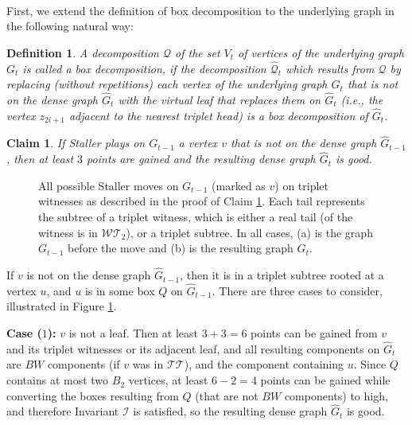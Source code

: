 \documentclass[11pt]{article}
\def\Proof{\par\noindent{\bf Proof:~}}
\newtheorem{definition}[theorem]{Definition}
\newtheorem{claim}[theorem]{Claim}
\theoremstyle{definition}
\def\invboxes{\mathcal{I}}
\begin{document}
\paragraph{}

First, we extend the definition of box decomposition to the underlying graph in the following natural way:
\begin{definition}
A decomposition $\mathcal{Q}$ of the set $V_t$ of vertices of the underlying graph $G_t$ is called a \emph{box decomposition}, if the decomposition $\hat{\mathcal{Q}}_t$ which results from $\mathcal{Q}$ by replacing (without repetitions) each vertex of the underlying graph $G_t$ that is not on the dense graph $\hat{G}_t$ with the virtual leaf that replaces them on $\hat{G}_t$ (i.e., the vertex $z_{2i+1}$ adjacent to the nearest triplet head) is a box decomposition of $\hat{G}_t$.
\end{definition}


\begin{claim}
\label{claim:staller_triplet}
If Staller plays on $G_{t-1}$ a vertex $v$ that is not on the dense graph $\hat{G}_{t-1}$, then at least $3$ points are gained and the resulting dense graph $\hat{G}_t$ is good.
\end{claim}
\begin{figure}[thbp] 
  \caption{\sf All possible Staller moves on $G_{t-1}$ (marked as $v$) on triplet witnesses as described in the proof of Claim \ref{claim:staller_triplet}.
	Each tail represents the subtree of a triplet witness, which is either a real tail (of the witness is in $\mathcal{WT}_2$), or a triplet subtree. 
	In all cases, (a) is the graph $G_{t-1}$ before the move and (b) is the resulting graph $G_t$.}
  \medskip
  \centering
  \label{fig:triplet_staller}
\end{figure}
\Proof
If $v$ is not on the dense graph $\hat{G}_{t-1}$, then it is in a triplet subtree rooted at a vertex $u$, and $u$ is in some box $Q$ on $\hat{G}_{t-1}$.
There are three cases to consider, illustrated in Figure \ref{fig:triplet_staller}.
\bigskip
\par\noindent
{\bf Case ($1$):}
$v$ is not a leaf.
Then at least $3 + 3 = 6$ points can be gained from $v$ and its triplet witnesses or its adjacent leaf, 
and all resulting components on $\hat{G}_t$ are $BW$ components (if $v$ was in $\mathcal{TT}$), and the component containing $u$.
Since $Q$ contains at most two $B_2$ vertices, at least $6 - 2 = 4$ points can be gained while converting the boxes resulting from $Q$ (that are not $BW$ components) to high, 
and therefore Invariant $\invboxes$ is satisfied, so the resulting dense graph $\hat{G}_t$ is good.
\end{document}
